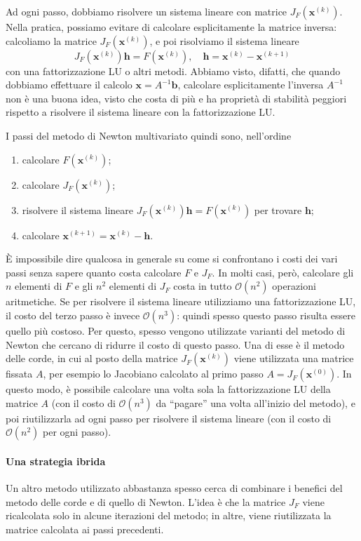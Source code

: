 \documentclass[a4paper]{report}
\theoremstyle{definition}
\theoremstyle{remark}
\newcommand{\x}{\mathbf{x}}
\renewcommand{\b}{\mathbf{b}}
\newcommand{\checkkey}[1]{%
        \ifstrequal{#1}{inf}{\setbool{showcontent}{true}}{}%
    }
\newenvironment{conditional}[1][]{%
        \setbool{showcontent}{false}%
        \forcsvlist\checkkey{#1}%
        \ifbool{showcontent}{\begingroup}{\expandafter\comment}%
    }{%
        \ifbool{showcontent}{\endgroup}{\expandafter\endcomment}%
    }
\newcommand{\checkkey}[1]{%
        \ifstrequal{#1}{ich}{\setbool{showcontent}{true}}{}%
    }
\newenvironment{conditional}[1][]{%
        \setbool{showcontent}{false}%
        \forcsvlist\checkkey{#1}%
        \ifbool{showcontent}{\begingroup}{\expandafter\comment}%
    }{%
        \ifbool{showcontent}{\endgroup}{\expandafter\endcomment}%
    }
\begin{document}
\begin{conditional}[ich]
Ad ogni passo, dobbiamo risolvere un sistema lineare con matrice $J_F(\x^{(k)})$. Nella pratica, possiamo evitare di calcolare esplicitamente la matrice inversa: calcoliamo la matrice $J_F(\x^{(k)})$, e poi risolviamo il sistema lineare
\[
    J_F(\x^{(k)}) \mathbf{h} = F(\x^{(k)}), \quad \mathbf{h} = \x^{(k)} - \x^{(k+1)}
\]
con una fattorizzazione LU o altri metodi. Abbiamo visto, difatti, che quando dobbiamo effettuare il calcolo $\x = A^{-1}\b$, calcolare esplicitamente l'inversa $A^{-1}$ non è una buona idea, visto che costa di più e ha proprietà di stabilità peggiori rispetto a risolvere il sistema lineare con la fattorizzazione LU.

I passi del metodo di Newton multivariato quindi sono, nell'ordine
\begin{enumerate}
    \item calcolare $F(\x^{(k)})$;
    \item calcolare $J_F(\x^{(k)})$;
    \item risolvere il sistema lineare $J_F(\x^{(k)}) \mathbf{h} = F(\x^{(k)})$ per trovare $\mathbf{h}$;
    \item calcolare $\x^{(k+1)} = \x^{(k)} - \mathbf{h}$.
\end{enumerate}
È impossibile dire qualcosa in generale su come si confrontano i costi dei vari passi senza sapere quanto costa calcolare $F$ e $J_F$. In molti casi, però, calcolare gli $n$ elementi di $F$ e gli $n^2$ elementi di $J_F$ costa in tutto $\mathcal{O}(n^2)$ operazioni aritmetiche. Se per risolvere il sistema lineare utilizziamo una fattorizzazione LU, il costo del terzo passo è invece $\mathcal{O}(n^3)$: quindi spesso questo passo risulta essere quello più costoso. Per questo, spesso vengono utilizzate varianti del metodo di Newton che cercano di ridurre il costo di questo passo. Una di esse è il metodo delle corde, in cui al posto della matrice $J_F(\x^{(k)})$ viene utilizzata una matrice fissata $A$, per esempio lo Jacobiano calcolato al primo passo $A = J_F(\x^{(0)})$. In questo modo, è possibile calcolare una volta sola la fattorizzazione LU della matrice $A$ (con il costo di $\mathcal{O}(n^3)$ da ``pagare'' una volta all'inizio del metodo), e poi riutilizzarla ad ogni passo per risolvere il sistema lineare (con il costo di $\mathcal{O}(n^2)$ per ogni passo).

\paragraph{Una strategia ibrida} Un altro metodo utilizzato abbastanza spesso cerca di combinare i benefici del metodo delle corde e di quello di Newton. L'idea è che la matrice $J_F$ viene ricalcolata solo in alcune iterazioni del metodo; in altre, viene riutilizzata la matrice calcolata ai passi precedenti.


\end{conditional}
\end{document}
